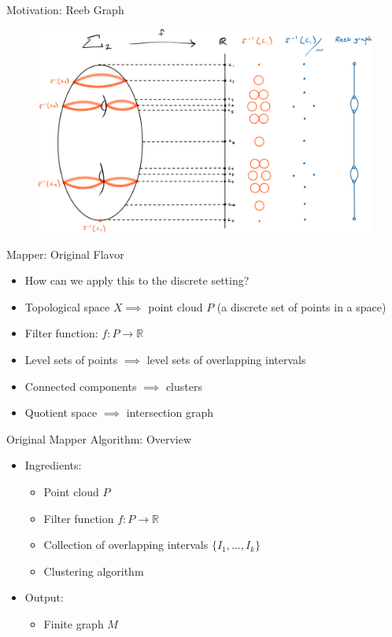 \documentclass{beamer}
\begin{document}
\begin{frame}{Motivation: Reeb Graph}
  \begin{figure}
    \begin{center}
      \hspace*{-.6cm}\includegraphics[width=1.1\textwidth]{reeb.png}
    \end{center}
  \end{figure}
\end{frame}

\begin{frame}{Mapper: Original Flavor}
\begin{itemize}
  \item How can we apply this to the discrete setting?
  \item Topological space $X \implies$ point cloud $P$ (a discrete set of points in a space)
  \item Filter function: $f: P\to\mathbb{R}$
  \item Level sets of points $\implies$ level sets of overlapping intervals
  \item Connected components $\implies$ clusters
  \item Quotient space $\implies$ intersection graph
\end{itemize}
\end{frame}

\begin{frame}{Original Mapper Algorithm: Overview}
  \begin{itemize}
    \item Ingredients:
    \begin{itemize}
      \item Point cloud $P$
      \item Filter function $f:P\to\mathbb{R}$
      \item Collection of overlapping intervals $\{I_1, \dots, I_k\}$
      \item Clustering algorithm
    \end{itemize}
    \item Output:
    \begin{itemize}
      \item Finite graph $M$
    \end{itemize}
  \end{itemize}
\end{frame}
\end{document}
